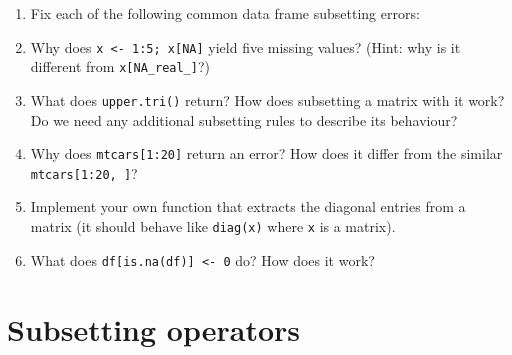 \begin{enumerate}
\def\labelenumi{\arabic{enumi}.}
\item
  Fix each of the following common data frame subsetting errors:

\begin{Shaded}
\begin{Highlighting}[]
\NormalTok{mtcars[mtcars}\OperatorTok{$}\StringTok{ }\NormalTok{, ]}
\NormalTok{mtcars[}\OperatorTok{-}\OperatorTok{:}\NormalTok{, ]}
\NormalTok{mtcars[mtcars}\OperatorTok{$}\OperatorTok{<=}\StringTok{ }\NormalTok{]}
\NormalTok{mtcars[mtcars}\OperatorTok{$}\OperatorTok{==}\StringTok{ } \OperatorTok{|}\StringTok{ }\NormalTok{, ]}
\end{Highlighting}
\end{Shaded}
\item
  Why does \texttt{x\ \textless{}-\ 1:5;\ x{[}NA{]}} yield five missing
  values? (Hint: why is it different from \texttt{x{[}NA\_real\_{]}}?)
\item
  What does \texttt{upper.tri()} return? How does subsetting a matrix
  with it work? Do we need any additional subsetting rules to describe
  its behaviour?

\begin{Shaded}
\begin{Highlighting}[]
\StringTok{ }\NormalTok{(}\OperatorTok{:}\NormalTok{, }\OperatorTok{:}\NormalTok{, } \NormalTok{)}
\NormalTok{x[}\NormalTok{(x)]}
\end{Highlighting}
\end{Shaded}
\item
  Why does \texttt{mtcars{[}1:20{]}} return an error? How does it differ
  from the similar \texttt{mtcars{[}1:20,\ {]}}?
\item
  Implement your own function that extracts the diagonal entries from a
  matrix (it should behave like \texttt{diag(x)} where \texttt{x} is a
  matrix).
\item
  What does \texttt{df{[}is.na(df){]}\ \textless{}-\ 0} do? How does it
  work?
\end{enumerate}

\hypertarget{subsetting-operators}{%
\section{Subsetting operators}\label{subsetting-operators}}

